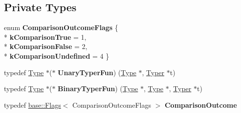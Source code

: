 \subsection*{Private Types}
\begin{DoxyCompactItemize}
\item 
enum {\bfseries Comparison\+Outcome\+Flags} \{ \\*
{\bfseries k\+Comparison\+True} = 1, 
\\*
{\bfseries k\+Comparison\+False} = 2, 
\\*
{\bfseries k\+Comparison\+Undefined} = 4
 \}\hypertarget{classv8_1_1internal_1_1compiler_1_1_typer_1_1_visitor_a8dc4dd62d012f33a56a7b93d8c456aae}{}\label{classv8_1_1internal_1_1compiler_1_1_typer_1_1_visitor_a8dc4dd62d012f33a56a7b93d8c456aae}

\item 
typedef \hyperlink{classv8_1_1internal_1_1_type}{Type} $\ast$($\ast$ {\bfseries Unary\+Typer\+Fun}) (\hyperlink{classv8_1_1internal_1_1_type}{Type} $\ast$, \hyperlink{classv8_1_1internal_1_1compiler_1_1_typer}{Typer} $\ast$t)\hypertarget{classv8_1_1internal_1_1compiler_1_1_typer_1_1_visitor_a4d4e7b0c8627f92c41767fcb60499fa0}{}\label{classv8_1_1internal_1_1compiler_1_1_typer_1_1_visitor_a4d4e7b0c8627f92c41767fcb60499fa0}

\item 
typedef \hyperlink{classv8_1_1internal_1_1_type}{Type} $\ast$($\ast$ {\bfseries Binary\+Typer\+Fun}) (\hyperlink{classv8_1_1internal_1_1_type}{Type} $\ast$, \hyperlink{classv8_1_1internal_1_1_type}{Type} $\ast$, \hyperlink{classv8_1_1internal_1_1compiler_1_1_typer}{Typer} $\ast$t)\hypertarget{classv8_1_1internal_1_1compiler_1_1_typer_1_1_visitor_af671a95a9bd7d12bfb9fb118b2f0e5bb}{}\label{classv8_1_1internal_1_1compiler_1_1_typer_1_1_visitor_af671a95a9bd7d12bfb9fb118b2f0e5bb}

\item 
typedef \hyperlink{classv8_1_1base_1_1_flags}{base\+::\+Flags}$<$ Comparison\+Outcome\+Flags $>$ {\bfseries Comparison\+Outcome}\hypertarget{classv8_1_1internal_1_1compiler_1_1_typer_1_1_visitor_a353ba0c17534f61f773deeae118afc8f}{}\label{classv8_1_1internal_1_1compiler_1_1_typer_1_1_visitor_a353ba0c17534f61f773deeae118afc8f}

\end{DoxyCompactItemize}
